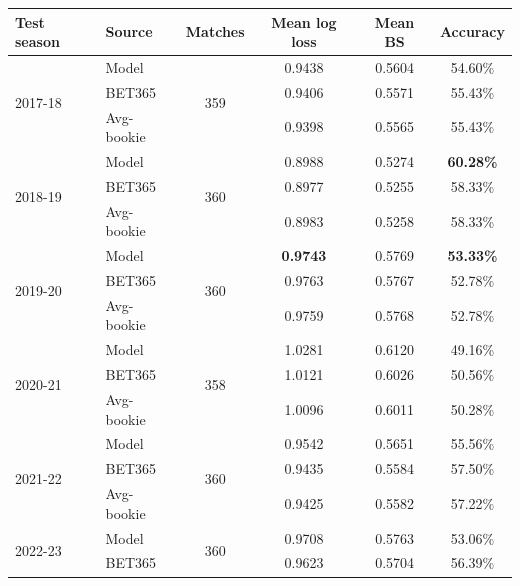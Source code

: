 \documentclass{article}
\begin{document}
\begin{table}[H]
\centering
\begin{tabular}{llcccc}
\toprule
\textbf{Test season} & \textbf{Source} & \textbf{Matches} & \textbf{Mean log loss} & \textbf{Mean BS} & \textbf{Accuracy} \\
\midrule
\multirow{3}{*}{2017-18} & Model      & \multirow{3}{*}{359} & 0.9438 & 0.5604 & 54.60\% \\
                          & BET365     &                       & 0.9406 & 0.5571 & 55.43\% \\
                          & Avg-bookie &                       & 0.9398 & 0.5565 & 55.43\% \\
\midrule
\multirow{3}{*}{2018-19} & Model      & \multirow{3}{*}{360} & 0.8988 & 0.5274 & \textbf{60.28\%} \\
                          & BET365     &                       & 0.8977 & 0.5255 & 58.33\% \\
                          & Avg-bookie &                       & 0.8983 & 0.5258 & 58.33\% \\
\midrule
\multirow{3}{*}{2019-20} & Model      & \multirow{3}{*}{360} & \textbf{0.9743} & 0.5769 & \textbf{53.33\%} \\
                          & BET365     &                       & 0.9763 & 0.5767 & 52.78\% \\
                          & Avg-bookie &                       & 0.9759 & 0.5768 & 52.78\% \\
\midrule
\multirow{3}{*}{2020-21} & Model      & \multirow{3}{*}{358} & 1.0281 & 0.6120 & 49.16\% \\
                          & BET365     &                       & 1.0121 & 0.6026 & 50.56\% \\
                          & Avg-bookie &                       & 1.0096 & 0.6011 & 50.28\% \\
\midrule
\multirow{3}{*}{2021-22} & Model      & \multirow{3}{*}{360} & 0.9542 & 0.5651 & 55.56\% \\
                          & BET365     &                       & 0.9435 & 0.5584 & 57.50\% \\
                          & Avg-bookie &                       & 0.9425 & 0.5582 & 57.22\% \\
\midrule
\multirow{3}{*}{2022-23} & Model      & \multirow{3}{*}{360} & 0.9708 & 0.5763 & 53.06\% \\
                          & BET365     &                       & 0.9623 & 0.5704 & 56.39\% \\

\end{tabular}
\end{table}
\end{document}

